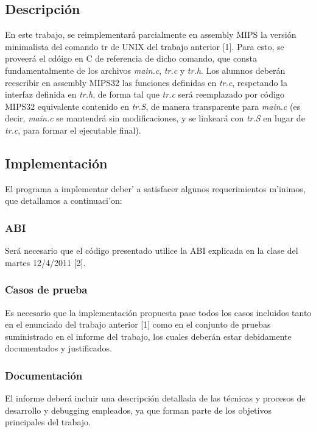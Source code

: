 \documentclass[a4paper,10pt]{article}
\begin{document}
\subsection{Descripci\'{o}n}
En este trabajo, se reimplementar\'{a} parcialmente en assembly MIPS la versi\'{o}n minimalista del comando tr de UNIX del 
trabajo anterior [1]. Para esto, se proveer\'{a} el cd\'{o}igo en C de referencia de dicho comando, que consta fundamentalmente 
de los archivos \textit{main.c}, \textit{tr.c} y \textit{tr.h}. 
Los alumnos deber\'{a}n reescribir en assembly MIPS32 las funciones definidas en \textit{tr.c}, respetando la interfaz definida 
en \textit{tr.h}, de forma tal que \textit{tr.c} ser\'{a} reemplazado por c\'{o}digo MIPS32 equivalente contenido en \textit{tr.S}, de 
manera transparente para \textit{main.c} (es decir, \textit{main.c} se mantendr\'{a} sin modificaciones, y se linkear\'{a} 
con \textit{tr.S} en lugar de \textit{tr.c}, para formar el ejecutable final).

\subsection{Implementaci\'{o}n}

El programa a implementar deber'{
a} satisfacer algunos requerimientos m'{i}nimos, que detallamos a continuaci'{o}n:

\subsubsection{ABI}
Ser\'{a} necesario que el c\'{o}digo presentado utilice la ABI explicada en la clase del martes 12/4/2011 [2].

\subsubsection{Casos de prueba}
Es necesario que la implementaci\'{o}n propuesta pase todos los casos incluidos tanto en el enunciado del trabajo anterior [1] como en el conjunto de pruebas
suministrado en el informe del trabajo, los cuales deber\'{a}n estar debidamente documentados y justificados.

\subsubsection{Documentaci\'{o}n}
El informe deber\'{a} incluir una descripci\'{o}n detallada de las t\'{e}cnicas y procesos
de desarrollo y debugging empleados, ya que forman parte de los objetivos principales del trabajo.
\end{document}
